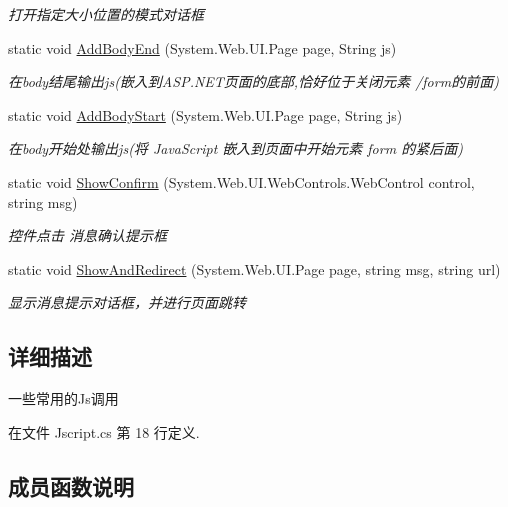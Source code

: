 \begin{DoxyCompactItemize}
\begin{DoxyCompactList}\small\item\em 打开指定大小位置的模式对话框 \end{DoxyCompactList}\item 
static void \hyperlink{class_x_c_l_net_tools_1_1_javascript_1_1_jscript_a3dcdf2894a7187508492083b6743abe1}{Add\+Body\+End} (System.\+Web.\+U\+I.\+Page page, String js)
\begin{DoxyCompactList}\small\item\em 在body结尾输出js(嵌入到\+A\+S\+P.\+N\+E\+T页面的底部,恰好位于关闭元素 /form的前面) \end{DoxyCompactList}\item 
static void \hyperlink{class_x_c_l_net_tools_1_1_javascript_1_1_jscript_ab8e14181b9b1e9f12462ef20f49d69ee}{Add\+Body\+Start} (System.\+Web.\+U\+I.\+Page page, String js)
\begin{DoxyCompactList}\small\item\em 在body开始处输出js(将 Java\+Script 嵌入到页面中开始元素 form 的紧后面) \end{DoxyCompactList}\item 
static void \hyperlink{class_x_c_l_net_tools_1_1_javascript_1_1_jscript_a94e45aa47def3164202b40ff0405f922}{Show\+Confirm} (System.\+Web.\+U\+I.\+Web\+Controls.\+Web\+Control control, string msg)
\begin{DoxyCompactList}\small\item\em 控件点击 消息确认提示框 \end{DoxyCompactList}\item 
static void \hyperlink{class_x_c_l_net_tools_1_1_javascript_1_1_jscript_ade747fd49c7e14dae3652e014a6255d9}{Show\+And\+Redirect} (System.\+Web.\+U\+I.\+Page page, string msg, string url)
\begin{DoxyCompactList}\small\item\em 显示消息提示对话框，并进行页面跳转 \end{DoxyCompactList}\end{DoxyCompactItemize}


\subsection{详细描述}
一些常用的\+Js调用 



在文件 Jscript.\+cs 第 18 行定义.



\subsection{成员函数说明}
